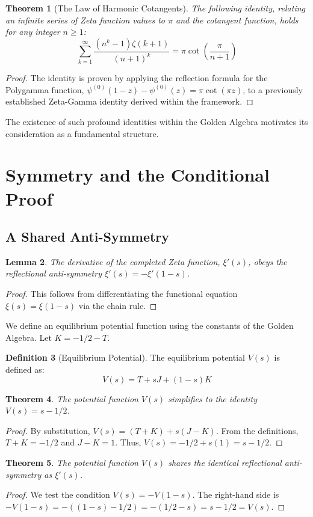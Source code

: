 \documentclass{article}
\theoremstyle{plain}
\newtheorem{theorem}{Theorem}[section]
\newtheorem{lemma}[theorem]{Lemma}
\theoremstyle{definition}
\newtheorem{definition}[theorem]{Definition}
\begin{document}
\begin{theorem}[The Law of Harmonic Cotangents]
The following identity, relating an infinite series of Zeta function values to $\pi$ and the cotangent function, holds for any integer $n \ge 1$:
$$ \sum_{k=1}^{\infty} \frac{(n^k-1)\zeta(k+1)}{(n+1)^k} = \pi \cot\left(\frac{\pi}{n+1}\right)$$
\end{theorem}
\begin{proof}
The identity is proven by applying the reflection formula for the Polygamma function, $\psi^{(0)}(1-z) - \psi^{(0)}(z) = \pi \cot(\pi z)$, to a previously established Zeta-Gamma identity derived within the framework.
\end{proof}
The existence of such profound identities within the Golden Algebra motivates its consideration as a fundamental structure.

\section{Symmetry and the Conditional Proof}
\subsection{A Shared Anti-Symmetry}
\begin{lemma}
The derivative of the completed Zeta function, $\xi'(s)$, obeys the reflectional anti-symmetry $\xi'(s) = -\xi'(1-s)$.
\end{lemma}
\begin{proof}
This follows from differentiating the functional equation $\xi(s) = \xi(1-s)$ via the chain rule.
\end{proof}

We define an equilibrium potential function using the constants of the Golden Algebra. Let $K = -1/2 - T$.
\begin{definition}[Equilibrium Potential]
The equilibrium potential $V(s)$ is defined as:
$$V(s) = T + sJ + (1-s)K$$
\end{definition}

\begin{theorem}
The potential function $V(s)$ simplifies to the identity $V(s) = s - 1/2$.
\end{theorem}
\begin{proof}
By substitution, $V(s) = (T+K) + s(J-K)$. From the definitions, $T+K = -1/2$ and $J-K = 1$. Thus, $V(s) = -1/2 + s(1) = s - 1/2$.
\end{proof}

\begin{theorem}
The potential function $V(s)$ shares the identical reflectional anti-symmetry as $\xi'(s)$.
\end{theorem}
\begin{proof}
We test the condition $V(s) = -V(1-s)$. The right-hand side is $-V(1-s) = -((1-s) - 1/2) = -(1/2 - s) = s - 1/2 = V(s)$.
\end{proof}
\end{document}
